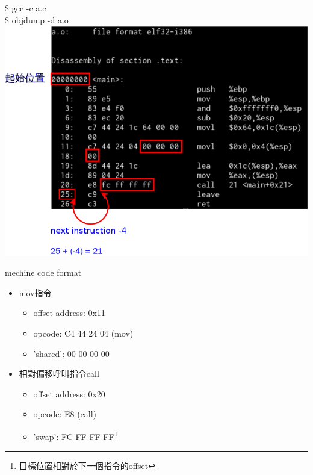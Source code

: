 \begin{frame}
    \$ gcc -c a.c\\
    \$ objdump -d a.o
    \includegraphics[height=.8\textheight]{./img/objdump-ao1.png}
\end{frame}

\begin{frame}{mechine code format}
    \begin{itemize}
        \item mov指令
        \begin{itemize}
            \item offset address: 0x11
            \item opcode: C4 44 24 04 (mov)
            \item 'shared': 00 00 00 00
        \end{itemize}
        \item 相對偏移呼叫指令call
        \begin{itemize}
            \item offset address: 0x20
            \item opcode: E8 (call)
            \item 'swap': FC FF FF FF\footnote[2]{目標位置相對於下一個指令的offset}
        \end{itemize}
    \end{itemize}
\end{frame}


